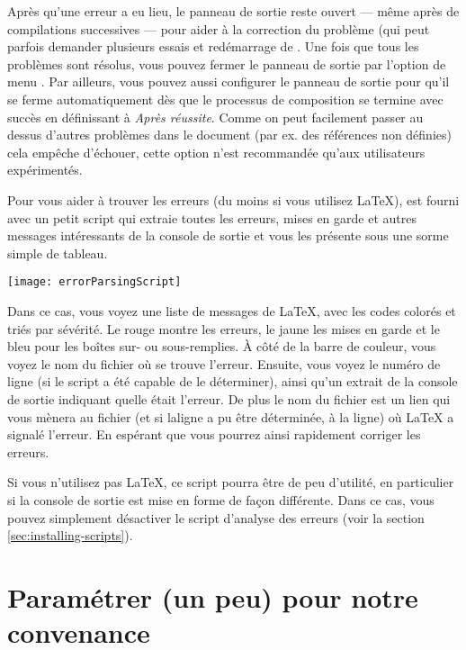 Après qu'une erreur a eu lieu, le panneau de sortie reste ouvert --- même après de compilations successives --- pour aider à la correction du problème (qui peut parfois demander plusieurs essais et redémarrage de \AllTeX. Une fois que tous les problèmes sont résolus, vous pouvez fermer le panneau de sortie par l'option de menu \submenu{}. Par ailleurs, vous pouvez aussi configurer le panneau de sortie pour qu'il se ferme automatiquement dès que le processus de composition se termine avec succès en définissant \submenu{}\submenu{}\submenu{} à \emph{Après réussite}. Comme on peut facilement passer au dessus d'autres problèmes dans le document (par ex. des références non définies) cela empêche \AllTeX{} d'échouer, cette option n'est recommandée qu'aux utilisateurs expérimentés.

Pour vous aider à trouver les erreurs (du moins si vous utilisez \LaTeX), \Tw{} est fourni avec un petit script qui extraie toutes les erreurs, mises en garde et autres messages intéressants de la console de sortie et vous les présente sous une sorme simple de tableau.

\begin{center}\label{fig:errorParsingScript}
\texttt{[image: errorParsingScript]}
\end{center}

Dans ce cas, vous voyez une liste de messages de \LaTeX{}, avec les codes colorés et triés par sévérité. Le rouge montre les erreurs, le jaune les mises en garde et le bleu pour les boîtes sur- ou sous-remplies. À côté de la barre de couleur, vous voyez le nom du fichier où se trouve l'erreur. Ensuite, vous voyez le numéro de ligne (si le script a été capable de le déterminer), ainsi qu'un extrait de la console de sortie indiquant quelle était l'erreur. De plus le nom du fichier est un lien qui vous mènera au fichier (et si laligne a pu être déterminée, à la ligne) où \LaTeX{} a signalé l'erreur. En espérant que vous pourrez ainsi rapidement corriger les erreurs.

Si vous n'utilisez pas \LaTeX, ce script pourra être de peu d'utilité, en particulier si la console de sortie est mise en forme de façon différente. Dans ce cas, vous pouvez simplement désactiver le script d'analyse des erreurs (voir la section \ref{sec:installing-scripts}).


\section{Paramétrer (un peu) \Tw{} pour notre convenance}

